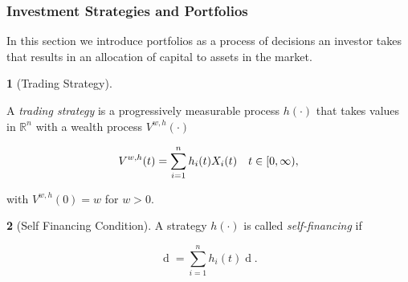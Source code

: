 \documentclass[british]{amsart} \usepackage{lmodern}
\numberwithin{equation}{section} \numberwithin{figure}{section}
\theoremstyle{plain} \newtheorem{thm}{\protect\theoremname}[section]
\theoremstyle{definition} \newtheorem{defn}[thm]{\protect\definitionname}
\theoremstyle{plain} \newtheorem{assumption}[thm]{\protect\assumptionname}
\theoremstyle{plain} \newtheorem{lem}[thm]{\protect\lemmaname}
\theoremstyle{plain} \newtheorem{prop}[thm]{\protect\propositionname}
\theoremstyle{remark} \newtheorem{rem}[thm]{\protect\remarkname}
\theoremstyle{plain} \newtheorem{cor}[thm]{\protect\corollaryname}
\renewcommand{\d}[1]{\mathop{\mathrm{d}{#1}}}
\newcommand{\abs}[1]{\mathop{|{#1}|}} \newcommand{\market}{\mathcal{M}}
\begin{document}
\subsubsection{Investment Strategies and Portfolios}

In this section we introduce portfolios as a process of decisions an investor
takes that results in an allocation of capital to assets in the market.

\begin{defn} [Trading Strategy]
  \label{def:tradingstrategy}

  A \textit{trading strategy} is a progressively measurable process $h(\cdot)$
  that takes values in $\mathbb{R}^{n}$ with a wealth process $V^{w,h}(\cdot)$ 

  \begin{equation*}
    V^{w,h}(t) = \sum_{i=1}^{n} h_{i}(t) X_{i}(t) 
    \quad t\in[0,\infty),
  \end{equation*}

  with $V^{w,h}(0)=w$ for $w > 0$. 


%

\end{defn}

\begin{defn} [Self Financing Condition]
  \label{def:selffinancingcondition}  
  A strategy $h(\cdot)$ is called \textit{self-financing} if 

  \begin{equation}
    \d{V^{w,h}(t)} = \sum_{i=1}^{n} h_{i}(t) \d{X_{i}(t)}.
  \end{equation}


\end{defn}
\end{document}
